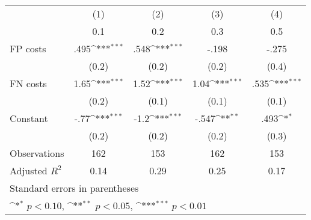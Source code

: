 {
\def\sym#1{\ifmmode^{#1}\else\(^{#1}\)\fi}
\begin{tabular}{l*{4}{c}}
\hline\hline
                &\multicolumn{1}{c}{(1)}&\multicolumn{1}{c}{(2)}&\multicolumn{1}{c}{(3)}&\multicolumn{1}{c}{(4)}\\
                &\multicolumn{1}{c}{0.1}&\multicolumn{1}{c}{0.2}&\multicolumn{1}{c}{0.3}&\multicolumn{1}{c}{0.5}\\
\hline
FP costs        &     .495\sym{***}&     .548\sym{***}&    -.198         &    -.275         \\
                &    (0.2)         &    (0.2)         &    (0.2)         &    (0.4)         \\
FN costs        &     1.65\sym{***}&     1.52\sym{***}&     1.04\sym{***}&     .535\sym{***}\\
                &    (0.2)         &    (0.1)         &    (0.1)         &    (0.1)         \\
Constant        &     -.77\sym{***}&     -1.2\sym{***}&    -.547\sym{**} &     .493\sym{*}  \\
                &    (0.2)         &    (0.2)         &    (0.2)         &    (0.3)         \\
\hline
Observations    &      162         &      153         &      162         &      153         \\
Adjusted \(R^{2}\)&     0.14         &     0.29         &     0.25         &     0.17         \\
\hline\hline
\multicolumn{5}{l}{\footnotesize Standard errors in parentheses}\\
\multicolumn{5}{l}{\footnotesize \sym{*} \(p<0.10\), \sym{**} \(p<0.05\), \sym{***} \(p<0.01\)}\\
\end{tabular}
}
